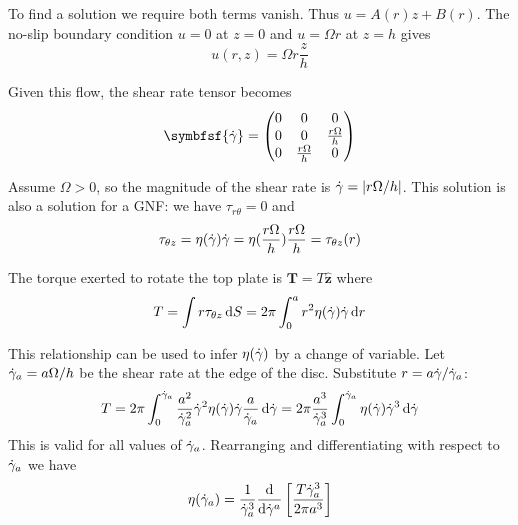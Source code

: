 \documentclass{jknotes}
\begin{document}
To find a solution we require both terms vanish. Thus $u = A(r) z + B(r)$. The
no-slip boundary condition $u = 0$ at $z=0$ and $u = \Omega r$ at $z = h$
gives
\begin{equation}
	u(r,z) = \Omega r \frac{z}{h}
\end{equation}

Given this flow, the shear rate tensor becomes
\begin{equation}
	\symbfsf{\srate} = \begin{pmatrix} 0 & 0 & 0 \\ 
		0 & 0 & \frac{r \Omega}{h} \\
0 & \frac{r \Omega}{h} & 0 \end{pmatrix}
\end{equation}

Assume $\Omega > 0$, so the magnitude of the shear rate is $\dot{\gamma} =
\abs{r\Omega/h}$. This solution is also a solution for a GNF: we have
$\tau_{r\theta} = 0$ and 
\begin{equation}
	\tau_{\theta z} = \eta(\dot{\gamma}) \dot{\gamma} =
	\eta(\frac{r\Omega}{h})\frac{r\Omega}{h} = \tau_{\theta z} (r)
\end{equation}

The torque exerted to rotate the top plate is $\symbf{T} = T\hat{\symbf{z}}$ where
\begin{equation}
	T = \int r \tau_{\theta z} \, \diffd S = 2\pi \int_0^a r^2 \eta(\srate)
	\srate \, \diffd r
\end{equation}

This relationship can be used to infer $\eta(\dot{\gamma})$ by a change of variable.
Let $\dot{\gamma}_a = a\Omega/h$ be the shear rate at the edge of the disc.
Substitute $r = a \dot{\gamma}/\dot{\gamma}_a$:
\begin{equation}
	T = 2\pi \int_0^{\srate_a} \frac{a^2}{\srate_a^2} \srate^2
	\eta(\srate)\srate \frac{a}{\srate_a} \, \diffd \srate = 2\pi
	\frac{a^3}{\srate_a^3} \int_0^{\srate_a} \eta(\srate) \srate^3 \, \diffd
	\srate
\end{equation}
This is valid for all values of $\dot{\gamma}_a$. Rearranging and differentiating
with respect to $\dot{\gamma}_a$ we have
\begin{equation}
	\eta(\srate_a) = \frac{1}{\srate_a^3} \frac{\diffd}{\diffd \srate^a}
	\left[ \frac{T \srate_a^3}{2\pi a^3}\right]
\end{equation}
\end{document}

